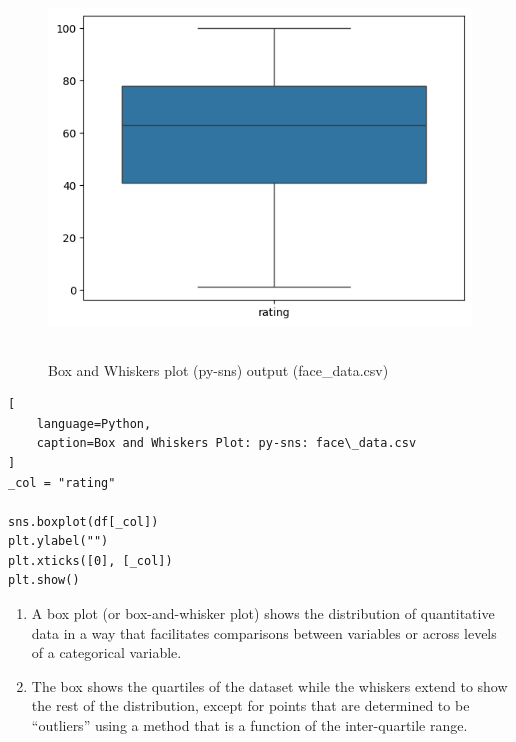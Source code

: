 \begin{table}[H]
\begin{minipage}[t]{0.35\linewidth}
\begin{figure}[H]
    \centering
    \includegraphics[width=0.9\linewidth, height=10cm, keepaspectratio]{images/data/__visualizations__/sns-box-rating-face-data.png}
    \caption{Box and Whiskers plot (py-sns) output (face\_data.csv)}
\end{figure}
\end{minipage}
\hspace{0.2cm}
\vrule width 1pt
\hspace{0.5cm}
\begin{minipage}[t]{0.57\linewidth}
\begin{lstlisting}[
    language=Python,
    caption=Box and Whiskers Plot: py-sns: face\_data.csv
]
_col = "rating"

sns.boxplot(df[_col])
plt.ylabel("")
plt.xticks([0], [_col])
plt.show()
\end{lstlisting}
\end{minipage}
\end{table}




\begin{enumerate}
    \item A box plot (or box-and-whisker plot) shows the distribution of quantitative data in a way that facilitates comparisons between variables or across levels of a categorical variable.  \hfill \cite{data/online/seaborn.boxplot}

    \item The box shows the quartiles of the dataset while the whiskers extend to show the rest of the distribution, except for points that are determined to be “outliers” using a method that is a function of the inter-quartile range. \hfill \cite{data/online/seaborn.boxplot}
\end{enumerate}



